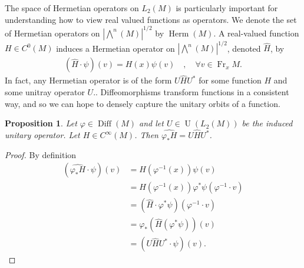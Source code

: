 \documentclass[12pt]{amsart}
\newtheorem{prop}{Proposition}
\DeclareMathOperator{\Diff}{Diff}
\DeclareMathOperator{\U}{U}
\DeclareMathOperator{\Fr}{Fr}
\DeclareMathOperator{\Herm}{Herm}
\begin{document}
 The space of Hermetian operators on $L_2(M)$ is particularly important for understanding how to view real valued functions as operators.
   We denote the set of Hermetian operators on $| \bigwedge^n(M) |^{1/2}$ by $\Herm(M)$.
 A real-valued function $H \in C^0(M)$ induces a Hermetian operator
on $| \bigwedge^n(M)|^{1/2}$, denoted $\widehat{H}$, by
\begin{align*}
  (\widehat{H} \cdot \psi)(v) = H(x) \psi(v) \quad , \quad \forall v \in \Fr_x M.
\end{align*}
In fact, any Hermetian operator is of the form $U \hat{H} U^*$ for some function $H$ and some unitray operator $U$.\cite[Chapter VII]{ReedSimon1980}.
Diffeomorphisms transform functions in a consistent way, and so we can hope to densely capture the unitary orbits of a function.

\begin{prop}
  Let $\varphi \in \Diff(M)$ and let $U \in \U(L_2(M))$ be the induced unitary operator.  Let $H \in C^{\infty}(M)$.  Then $\widehat{ \varphi_*H} = U \hat{H} U^*$.
\end{prop}
\begin{proof}
  By definition
  \begin{align*}
    (\widehat{\varphi_*H} \cdot \psi )(v) &= H(\varphi^{-1}(x)) \psi(v) \\
    &= H(\varphi^{-1}(x)) \varphi^*\psi( \varphi^{-1} \cdot v) \\
    &= ( \hat{H} \cdot \varphi^* \psi)( \varphi^{-1} \cdot v) \\
    &= \varphi_* ( \hat{H}( \varphi^* \psi)) (v) \\
    &= (U\hat{H}U^* \cdot \psi) (v).
  \end{align*}
\end{proof}
\end{document}
